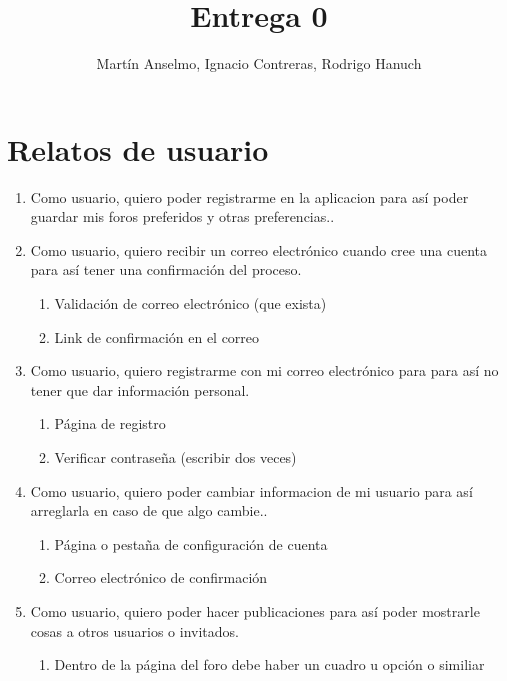\documentclass[12pt, letterpaper, notitlepage]{article}
\title{\textbf{Entrega 0}}
\author{Martín Anselmo, Ignacio Contreras, Rodrigo Hanuch}
\begin{document}
	
	\clearpage\maketitle
	\thispagestyle{empty}
	
	\newpage
	
	\section*{Relatos de usuario}
	\newcommand{\story}[3]{Como {#1}, quiero {#2} para {#3}.}
	
	\begin{enumerate}
		
		\item \story{usuario}{poder registrarme en la aplicacion}	
		{así poder guardar mis foros preferidos y otras preferencias.}
		
		
		\item \story{usuario}{recibir un correo electrónico cuando cree una cuenta}	
		{así tener una confirmación del proceso}
		\begin{enumerate}
			\item Validación de correo electrónico (que exista)
			\item Link de confirmación en el correo		
		\end{enumerate}
		
		\item \story{usuario}{registrarme con mi correo electrónico}{para así no tener que 
			dar información personal}
		\begin{enumerate}
			\item Página de registro
			\item Verificar contraseña (escribir dos veces)
		\end{enumerate}
		
		
		\item \story{usuario}{poder cambiar informacion de mi usuario}{así arreglarla en caso de que algo cambie.}
		\begin{enumerate}
			\item Página o pestaña de configuración de cuenta
			\item Correo electrónico de confirmación
		\end{enumerate}
		
		
		\item \story{usuario}{poder hacer publicaciones}{así poder mostrarle cosas a otros usuarios o invitados}
		\begin{enumerate}
			\item Dentro de la página del foro debe haber un cuadro u opción  o similiar
		\end{enumerate}
		

\end{enumerate}
\end{document}
